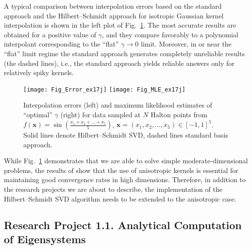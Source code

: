 \documentclass[11pt]{NSFamsart}
\newcommand{\bx}{{\boldsymbol{x}}}
\begin{document}
A typical comparison between interpolation errors based on the standard approach and the Hilbert--Schmidt approach for isotropic Gaussian kernel interpolation is shown in the left plot of Fig.~\ref{Fig_HSSVD}. The most accurate results are obtained for a positive value of $\gamma$, and they compare favorably to a polynomial interpolant corresponding to the ``flat'' $\gamma\to0$ limit. Moreover, in or near the ``flat'' limit regime the standard approach generates completely unreliable results (the dashed lines), i.e., the standard approach yields reliable answers only for relatively spiky kernels.

\begin{figure}[h]
    \centering
    \texttt{[image: Fig\_Error\_ex17j]}
    \texttt{[image: Fig\_MLE\_ex17j]}
\caption{Interpolation errors (left) and maximum likelihood estimates of ``optimal'' $\gamma$ (right) for data sampled at $N$ Halton points from $f(\bx) = \sin\left(\tfrac{x_1+x_2+\ldots+x_5}{5}\right)$, $\bx=(x_1,x_2,\ldots,x_5) \in [-1,1]^5$. Solid lines denote Hilbert--Schmidt SVD, dashed lines standard basis approach.}\label{Fig_HSSVD}
\end{figure}

While Fig.~\ref{Fig_HSSVD} demonstrates that we are able to solve simple moderate-dimensional problems, the results of \cite{FasHicWoz12b, FasHicWoz12a} show that the use of anisotropic kernels is essential for maintaining good convergence rates in high dimensions. Therefore, in addition to the research projects we are about to describe, the implementation of the Hilbert--Schmidt SVD algorithm needs to be extended to the anisotropic case.

\subsection*{Research Project 1.1. Analytical Computation of Eigensystems} \label{AnalyticEigensubsec}
\end{document}
